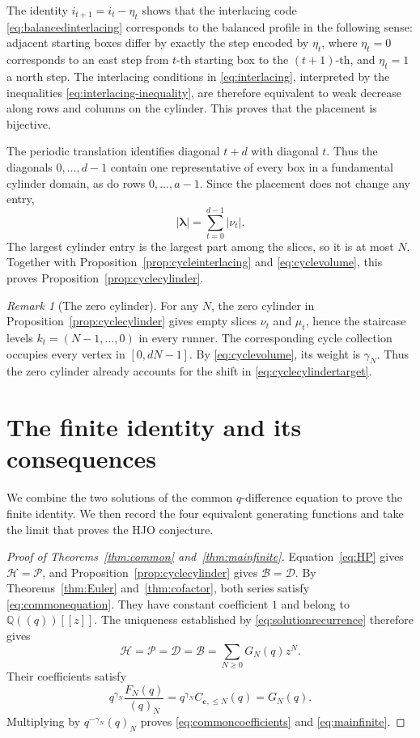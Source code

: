 \documentclass[12pt,reqno]{amsart}
\numberwithin{equation}{section}
\theoremstyle{definition}
\theoremstyle{remark}
\newtheorem*{remark}{Remark}
\theoremstyle{plain}
\newcommand{\QQ}{\mathbb Q}
\newcommand{\cc}{\mathbf c}
\newcommand{\Hseries}{\mathscr H}
\newcommand{\Dseries}{\mathscr D}
\newcommand{\Bseries}{\mathscr B}
\newcommand{\Pseries}{\mathscr P}
\begin{document}
The identity $i_{t+1}=i_t-\eta_t$ shows that the interlacing code \eqref{eq:balancedinterlacing} corresponds to the balanced profile in the following sense: adjacent starting boxes differ by exactly the step encoded by $\eta_t$, where $\eta_t=0$ corresponds to an east step from $t$-th starting box to the $(t+1)$-th, and $\eta_t=1$ a north step.  The interlacing conditions in \eqref{eq:interlacing}, interpreted by the inequalities \eqref{eq:interlacing-inequality}, are therefore equivalent to weak decrease along rows and columns on the cylinder. This proves that the placement is bijective.

The periodic translation identifies diagonal $t+d$ with diagonal $t$.  Thus the diagonals $0,\ldots,d-1$ contain one representative of every box in a fundamental cylinder domain, as do rows $0,\dots,a-1$. Since the placement does not change any entry,
\begin{equation}\label{eq:volume}
 |\boldsymbol\lambda|=\sum_{t=0}^{d-1}|\nu_t|.
\end{equation}
The largest cylinder entry is the largest part among the slices, so it is at most $N$.  Together with Proposition~\ref{prop:cycleinterlacing} and \eqref{eq:cyclevolume}, this proves Proposition~\ref{prop:cyclecylinder}.

\begin{remark}[The zero cylinder]
For any $N$, the zero cylinder in Proposition~\ref{prop:cyclecylinder} gives empty slices $\nu_t$ and $\mu_t$, hence the staircase levels $k_t=(N-1,\dots,0)$ in every runner. The corresponding cycle collection occupies every vertex in $[0,dN-1]$. By \eqref{eq:cyclevolume}, its weight is $\gamma_N$. Thus the zero cylinder already accounts for the shift in \eqref{eq:cyclecylindertarget}.
\end{remark}


\section{The finite identity and its consequences}\label{sec:conclusion}
We combine the two solutions of the common $q$-difference equation
to prove the finite identity.  We then record the four equivalent
generating functions and take the limit that proves the HJO conjecture.

\begin{proof}[Proof of Theorems~\ref{thm:common} and~\ref{thm:mainfinite}]
Equation~\eqref{eq:HP} gives $\Hseries=\Pseries$, and
Proposition~\ref{prop:cyclecylinder} gives $\Bseries=\Dseries$.
By Theorems~\ref{thm:Euler} and~\ref{thm:cofactor}, both series
satisfy \eqref{eq:commonequation}.  They have constant coefficient
$1$ and belong to $\QQ((q))[[z]]$.  The uniqueness established by
\eqref{eq:solutionrecurrence} therefore gives
\[
 \Hseries=\Pseries=\Dseries=\Bseries
      =\sum_{N\ge0}G_N(q)z^N.
\]
Their coefficients satisfy
\[
 q^{\gamma_N}\frac{F_N(q)}{(q)_N}
       =q^{\gamma_N}C_{\cc,\le N}(q)=G_N(q).
\]
Multiplying by $q^{-\gamma_N}(q)_N$ proves
\eqref{eq:commoncoefficients} and \eqref{eq:mainfinite}.
\end{proof}
\end{document}
